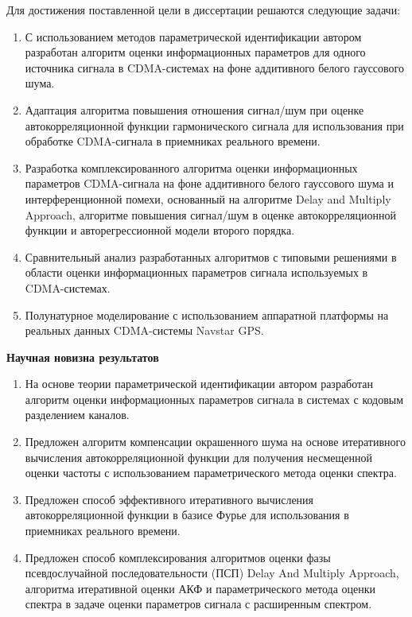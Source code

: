 Для достижения поставленной цели в диссертации решаются следующие задачи:
\begin{enumerate}
	\item {С использованием методов параметрической идентификации автором разработан алгоритм оценки информационных параметров для одного источника сигнала
		в CDMA-системах на фоне аддитивного белого гауссового шума.}
	\item {Адаптация алгоритма повышения отношения сигнал/шум при оценке автокорреляционной функции гармонического сигнала для использования при обработке
		CDMA-сигнала в приемниках реального времени.}
	\item {Разработка комплексированного алгоритма оценки информационных параметров CDMA-сигнала на фоне аддитивного белого гауссового шума и
		интерференционной помехи, основанный на алгоритме Delay and Multiply Approach, алгоритме повышения сигнал/шум в оценке автокорреляционной функции 
		и авторегрессионной модели второго порядка.}
	\item {Сравнительный анализ разработанных алгоритмов с типовыми решениями в области оценки информационных параметров сигнала используемых в CDMA-системах.}
	\item {Полунатурное моделирование с использованием аппаратной платформы на реальных данных CDMA-системы Navstar GPS.}
\end{enumerate}

{\bf{Научная новизна результатов}}
\begin{enumerate}
	\item{На основе теории параметрической идентификации автором разработан алгоритм оценки информационных параметров сигнала в системах с кодовым разделением каналов.}
	\item{Предложен алгоритм компенсации окрашенного шума на основе итеративного вычисления автокорреляционной функции для
		получения несмещенной оценки частоты с использованием параметрического метода оценки спектра.}
	\item{Предложен способ эффективного итеративного вычисления автокорреляционной функции в базисе Фурье для использования в
		приемниках реального времени.}
	\item{Предложен способ комплексирования алгоритмов оценки фазы псевдослучайной последовательности (ПСП) Delay And Multiply Approach, алгоритма итеративной оценки АКФ и
		параметрического метода оценки спектра в задаче оценки параметров сигнала с расширенным спектром.}
\end{enumerate}


